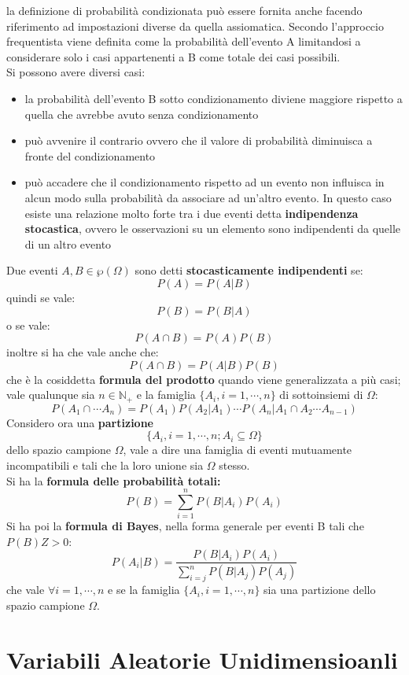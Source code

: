 \documentclass[a4paper,12pt, oneside]{book}
\begin{document}
la definizione di probabilità condizionata può essere fornita
anche facendo riferimento ad impostazioni diverse da quella assiomatica. Secondo l'approccio frequentista viene definita come la probabilità dell'evento A limitandosi a
considerare solo i casi appartenenti a B come totale dei casi possibili.\\
Si possono avere diversi casi:
\begin{itemize}
\item la probabilità dell’evento B sotto condizionamento diviene maggiore rispetto a quella che avrebbe avuto senza condizionamento
\item può avvenire il contrario ovvero che il valore di probabilità diminuisca a fronte del condizionamento
\item può accadere che il condizionamento rispetto ad un evento non
influisca in alcun modo sulla probabilità da associare ad un’altro evento. In questo caso esiste una relazione molto forte tra i due eventi detta \textbf{indipendenza stocastica}, ovvero le osservazioni su un elemento sono indipendenti da quelle di un altro evento
\end{itemize}
Due eventi $A,B\in\wp(\Omega)$ sono detti \textbf{stocasticamente indipendenti} se:
\[P(A)=P(A|B)\]
quindi se vale:
\[P(B)=P(B|A)\]
o se vale:
\[P(A\cap B)=P(A)P(B)\]
inoltre si ha che vale anche che:
\[P(A\cap B)=P(A|B)P(B)\]
che è la cosiddetta \textbf{formula del prodotto} quando viene generalizzata a più casi; vale qualunque sia $n\in \mathbb{N}_+$ e la famiglia $\{A_i,i=1,\cdots, n\}$ di sottoinsiemi di $\Omega$:
\[P(A_1\cap\cdots A_n)=P(A_1)P(A_2|A_1)\cdots P(A_n|A_1\cap A_2\cdots A_{n-1})\]
Considero ora una \textbf{partizione} 
\[\{A_i, i=1,\cdots,n;A_i\subseteq \Omega\}\]
dello spazio campione $\Omega$, vale a dire una famiglia di eventi mutuamente incompatibili e
tali che la loro unione sia $\Omega$ stesso. \\
Si ha la \textbf{formula delle probabilità totali:}
\[P(B)=\sum_{i=1}^n P(B|A_i)P(A_i)\]
Si ha poi la \textbf{formula di Bayes}, nella forma generale per eventi B tali che $P(B)Z>0$:
\[P(A_i|B)=\frac{P(B|A_i)P(A_i)}{\sum_{i=j}^n P(B|A_j)P(A_j)}\]
che vale $\forall i=1,\cdots, n$ e se la famiglia $\{A_i,i=1,\cdots, n\}$ sia una partizione dello spazio campione $\Omega$.
\section{Variabili Aleatorie Unidimensioanli}
\end{document}
